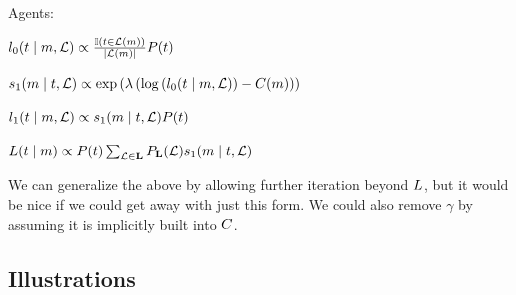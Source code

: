 \documentclass{article}
\begin{document}
\begin{examples}
\item Agents:
  \begin{examples}
  \item\label{l0}%
    $l_{0}(t \mid m, \mathcal{L}) \propto
    \frac{\mathbb{I}(t \in \mathcal{L}(m))}{|\mathcal{L}(m)|}
    P(t)$

  \item\label{s1}%
    $s_{1}(m \mid t, \mathcal{L}) \propto
    \exp
    \left(
      \lambda
      \left(
        \log\left(l_{0}(t \mid m, \mathcal{L}) \right)
        - 
        C(m)
      \right)
    \right)$
    
  \item\label{l1}%
    $l_{1}(t \mid m, \mathcal{L}) \propto 
    s_{1}(m \mid t, \mathcal{L})
    P(t)$

  \item\label{L} 
    $L(t \mid m) 
    \propto 
    P(t)
    \sum_{\mathcal{L} \in \mathbf{L}}
    P_{\mathbf{L}}(\mathcal{L})
    s_{1}(m \mid t, \mathcal{L})$
  \end{examples}

\item We can generalize the above by allowing further iteration beyond
  $L$, but it would be nice if we could get away
  with just this form. We could also remove $\gamma$ by assuming it
  is implicitly built into $C$.

\end{examples}


\subsection{Illustrations}

\newcommand{\sNN}{\texttt{NN}}
\newcommand{\sNS}{\texttt{NS}}
\newcommand{\sNA}{\texttt{NA}}

\newcommand{\sSN}{\texttt{SN}}
\newcommand{\sSS}{\texttt{SS}}
\newcommand{\sSA}{\texttt{SA}}

\newcommand{\sAN}{\texttt{AN}}
\newcommand{\sAS}{\texttt{AS}}
\newcommand{\sAA}{\texttt{AA}}
\end{document}
